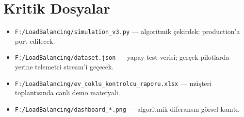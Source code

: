 \documentclass[11pt,a4paper]{article}
\begin{document}
\section*{Kritik Dosyalar}

\begin{itemize}
    \item \texttt{F:/LoadBalancing/simulation\_v3.py} --- algoritmik çekirdek; production'a port edilecek.
    \item \texttt{F:/LoadBalancing/dataset.json} --- yapay test verisi; gerçek pilotlarda yerine telemetri stream'i geçecek.
    \item \texttt{F:/LoadBalancing/ev\_coklu\_kontrolcu\_raporu.xlsx} --- müşteri toplantısında canlı demo materyali.
    \item \texttt{F:/LoadBalancing/dashboard\_*.png} --- algoritmik diferansın görsel kanıtı.
\end{itemize}
\end{document}
